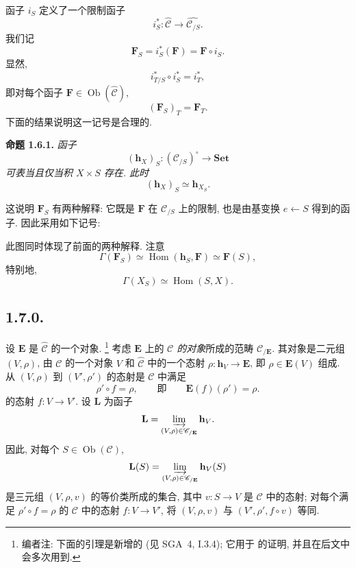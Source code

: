 函子 \(i_S\) 定义了一个限制函子
\[
  i_S^*:\widehat{\mathscr C}\longrightarrow
    \widehat{\mathscr C_{/S}}.
\]
我们记
\[
  \mathbf F_S=i_S^*(\mathbf F)=\mathbf F\circ i_S.
\]
显然,
\[
  i_{T/S}^*\circ i_S^*=i_T^*,
\]
即对每个函子
\(\mathbf F\in\operatorname{Ob}(\widehat{\mathscr C})\),
\[
  (\mathbf F_S)_T=\mathbf F_T.
\]
下面的结果说明这一记号是合理的.

\medskip
\noindent{}\textbf{命题 1.6.1.}
\textit{函子
\[
  (\mathbf h_X)_S:(\mathscr C_{/S})^{\circ}\longrightarrow\mathbf{Set}
\]
可表当且仅当积 \(X\times S\) 存在. 此时
\[
  (\mathbf h_X)_S\simeq\mathbf h_{X_S}.
\]}

这说明 \(\mathbf F_S\) 有两种解释: 它既是 \(\mathbf F\) 在
\(\mathscr C_{/S}\) 上的限制, 也是由基变换 \(e\leftarrow S\)
得到的函子. 因此采用如下记号:

\begin{center}
  
\end{center}

此图同时体现了前面的两种解释. 注意
\[
  \Gamma(\mathbf F_S)
    \simeq\operatorname{Hom}(\mathbf h_S,\mathbf F)
    \simeq\mathbf F(S),
\]
特别地,
\[
  \Gamma(X_S)\simeq\operatorname{Hom}(S,X).
\]

\subsection*{1.7.0.}

设 \(\mathbf E\) 是 \(\widehat{\mathscr C}\) 的一个对象.
\footnote{编者注: 下面的引理是新增的 (见 SGA~4,
I.3.4); 它用于  的证明,
并且在后文中会多次用到.}
考虑 \(\mathbf E\) 上的 \emph{\(\mathscr C\) 的对象}所成的范畴
\(\mathscr C_{/\mathbf E}\). 其对象是二元组 \((V,\rho)\),
由 \(\mathscr C\) 的一个对象 \(V\) 和 \(\widehat{\mathscr C}\) 中的一个态射
\(\rho:\mathbf h_V\to\mathbf E\), 即 \(\rho\in\mathbf E(V)\) 组成.
从 \((V,\rho)\) 到 \((V',\rho')\) 的态射是 \(\mathscr C\) 中满足
\[
  \rho'\circ f=\rho,
  \qquad\text{即}\qquad
  \mathbf E(f)(\rho')=\rho.
\]
的态射 \(f:V\to V'\).
设 \(\mathbf L\) 为函子
\[
  \mathbf L=\varinjlim_{(V,\rho)\in\mathscr C_{/\mathbf E}}\mathbf h_V.
\]
因此, 对每个 \(S\in\operatorname{Ob}(\mathscr C)\),
\[
  \mathbf L(S)
    =\varinjlim_{(V,\rho)\in\mathscr C_{/\mathbf E}}\mathbf h_V(S)
\]
是三元组 \((V,\rho,v)\) 的等价类所成的集合, 其中
\(v:S\to V\) 是 \(\mathscr C\) 中的态射; 对每个满足
\(\rho'\circ f=\rho\) 的 \(\mathscr C\) 中的态射 \(f:V\to V'\),
将 \((V,\rho,v)\) 与 \((V',\rho',f\circ v)\) 等同.

